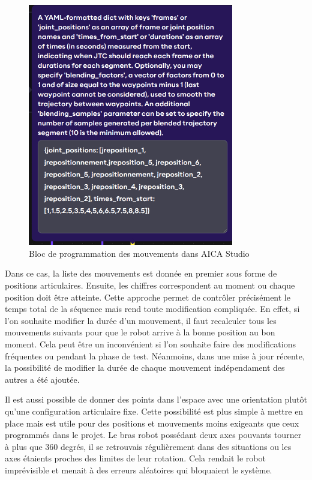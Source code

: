 \begin{figure}[H]
    \centering
    \includegraphics[width=0.8\textwidth]{assets/figures/AICA_payload.png}
    \caption{Bloc de programmation des mouvements dans AICA Studio}
    \label{fig:payload_block}
\end{figure}

Dans ce cas, la liste des mouvements est donnée en premier sous forme de positions articulaires. Ensuite, les chiffres correspondent au moment ou chaque position doit être atteinte. Cette approche permet de contrôler précisément le temps total de la séquence mais rend toute modification compliquée. En effet, si l'on souhaite modifier la durée d'un mouvement, il faut recalculer tous les mouvements suivants pour que le robot arrive à la bonne position au bon moment. Cela peut être un inconvénient si l'on souhaite faire des modifications fréquentes ou pendant la phase de test. Néanmoins, dans une mise à jour récente, la possibilité de modifier la durée de chaque mouvement indépendament des autres a été ajoutée.

Il est aussi possible de donner des points dans l'espace avec une orientation plutôt qu'une configuration articulaire fixe. Cette possibilité est plus simple à mettre en place mais est utile pour des positions et mouvements moins exigeants que ceux programmés dans le projet. Le bras robot possédant deux axes pouvants tourner à plus que 360 degrés, il se retrouvais régulièrement dans des situations ou les axes étaients proches des limites de leur rotation. Cela rendait le robot imprévisible et menait à des erreurs aléatoires qui bloquaient le système.
